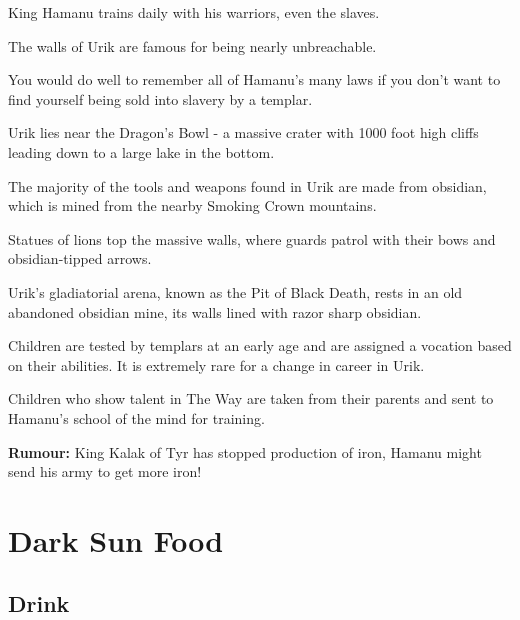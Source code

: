 \begin{multicols}{2}
\begin{description}
    \item King Hamanu trains daily with his warriors, even the slaves.
    \item The walls of Urik are famous for being nearly unbreachable.
    \item You would do well to remember all of Hamanu’s many laws if you don’t want to find yourself being sold into slavery by a templar.
    \item Urik lies near the Dragon’s Bowl - a massive crater with 1000 foot high cliffs leading down to a large lake in the bottom.
    \item The majority of the tools and weapons found in Urik are made from obsidian, which is mined from the nearby Smoking Crown mountains.
    \item Statues of lions top the massive walls, where guards patrol with their bows and obsidian-tipped arrows.
    \item Urik’s gladiatorial arena, known as the Pit of Black Death, rests in an old abandoned obsidian mine, its walls lined with razor sharp obsidian.
    \item Children are tested by templars at an early age and are assigned a vocation based on their abilities. It is extremely rare for a change in career in Urik.
    \item Children who show talent in The Way are taken from their parents and sent to Hamanu’s school of the mind for training.
    \item \textbf{Rumour:} King Kalak of Tyr has stopped production of iron, Hamanu might send his army to get more iron!
\end{description}

\end{multicols}

\section{Dark Sun Food}

\subsection{Drink}

